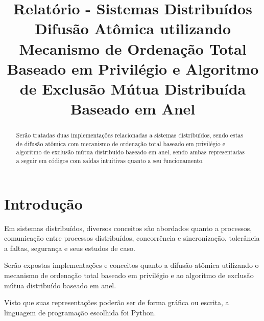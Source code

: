 \documentclass[10pt,conference]{IEEEtran}
\begin{document}
\title{Relatório - Sistemas Distribuídos \\
    \large{Difusão Atômica utilizando Mecanismo de Ordenação Total Baseado em Privilégio e Algoritmo de Exclusão Mútua Distribuída Baseado em Anel}}

\newif\iffinal
\finalfalse
\finaltrue
\newcommand{\jemsid}{99999}

\iffinal
\author{
}

\else
  \author{Sibgrapi paper ID: \jemsid \\ }
\fi


\maketitle

\begin{abstract}
Serão tratadas duas implementações relacionadas a sistemas distribuídos, sendo estas de difusão atômica com mecanismo de ordenação total baseado em privilégio e algoritmo de exclusão mútua distribuído baseado em anel, sendo ambas representadas a seguir em códigos com saídas intuitivas quanto a seu funcionamento.
\end{abstract}
\IEEEpeerreviewmaketitle

\section{Introdução}
Em sistemas distribuídos, diversos conceitos são abordados quanto a processos, comunicação entre processos distribuídos, concorrência e sincronização, tolerância a faltas, segurança e seus estudos de caso. 

Serão expostas implementações e conceitos quanto a difusão atômica utilizando o mecanismo de ordenação total baseado em privilégio e ao algoritmo de exclusão mútua distribuído baseado em anel.

Visto que suas representações poderão ser de forma gráfica ou escrita, a linguagem de programação escolhida foi Python.
\end{document}

